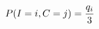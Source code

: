 \documentclass[preview]{standalone}
\begin{document}
\begin{align*}
\special{dvisvgm:raw <g id='unique000'>}P(I=i,C=j)=\frac{q_i}{3}\special{dvisvgm:raw </g>}
\end{align*}
\end{document}
